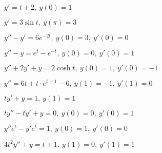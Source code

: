 	\begin{multicols}{2}
		\begin{enumtasks}

			\item \( y' = t + 2, ~ y(0) = 1 \) 								%
			\item \( y' = 3\sin{t}, ~ y(\pi) = 3 \)							%
			\item \( y'' - y' = 6e^{-2t}, ~ y(0) = 3, ~ y'(0) = 0 \)		%
			\item \( y'' - y = e^{t} - e^{-t}, ~ y(0) = 0, ~ y'(0) = 1 \)	%

		\end{enumtasks}
	\end{multicols}

	\begin{enumtasks}

		\item \( y'' + 2y' + y = 2\cosh{t}, ~ y(0) = 1, ~ y'(0) = -1 \)	%
		\item \( y'' = 6t + t \cdot e^{t-1} - 6, ~ y(1) = -1, ~ y'(1) = 0 \) %
	
	\end{enumtasks}

	\vspace{15pt}

	\begin{enumtasks}

		\item \( ty' + y = 1, ~ y(1) = 1 \)							%
		\item \( ty'' - ty' + y = 0, ~ y(0) = 0, ~ y'(0) = 1 \)		%
		\item \( y'' e^t - y' e^{t} = 1, ~ y(0) = 1, ~ y'(0) = 0 \)	%
		\item \( 4t^2 y'' + y = t + 1, ~ y(1) = 0, ~ y'(1) = 1 \)	%

	\end{enumtasks}

	\vspace{15pt}

